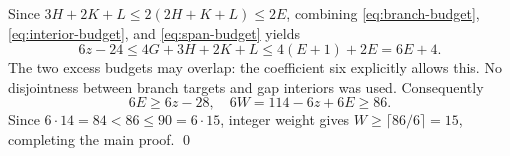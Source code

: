 \documentclass{article}
\begin{document}
Since \(3H + 2K + L \le 2(2H + K + L) \le 2E\), combining \eqref{eq:branch-budget},
\eqref{eq:interior-budget}, and \eqref{eq:span-budget} yields
\begin{equation}
  6z - 24 \le 4G + 3H + 2K + L \le 4(E + 1) + 2E = 6E + 4.
\end{equation}
The two excess budgets may overlap: the coefficient six explicitly allows this. No disjointness
between branch targets and gap interiors was used. Consequently
\begin{equation}
  6E \ge 6z - 28, \quad 6W = 114 - 6z + 6E \ge 86.
\end{equation}
Since \(6 \cdot 14 = 84 < 86 \le 90 = 6 \cdot 15\), integer weight gives
\(W \ge \lceil 86/6 \rceil = 15\), completing the main proof. \qed
\end{document}

